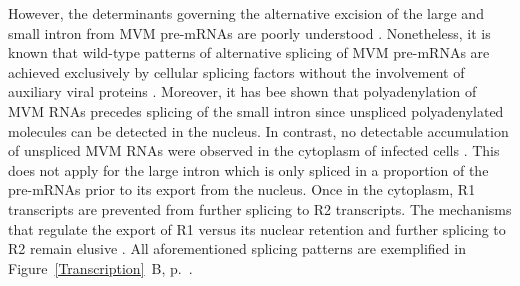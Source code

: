 However, the determinants governing the alternative excision of the large and small intron from MVM pre-mRNAs are poorly understood \cite{pmid9499034, pmid10329570, pmid8151756, pmid7666519, pmid7637034, pmid9858560}. Nonetheless, it is known that wild-type patterns of alternative splicing of MVM pre-mRNAs are achieved exclusively by cellular splicing factors without the involvement of auxiliary viral proteins \cite{pmid1592259}. Moreover, it has bee shown that polyadenylation of MVM RNAs precedes splicing of the small intron since unspliced polyadenylated molecules can be detected in the nucleus. In contrast, no detectable accumulation of unspliced MVM RNAs were observed in the cytoplasm of infected cells \cite{pmid3346950}. This does not apply for the large intron which is only spliced in a proportion of the pre-mRNAs prior to its export from the nucleus. Once in the cytoplasm, R1 transcripts are prevented from further splicing to R2 transcripts. The mechanisms that regulate the export of R1 versus its nuclear retention and further splicing to R2 remain elusive \cite{Transcription}. All aforementioned splicing patterns are exemplified in Figure~\ref{Transcription}~B, p.~\pageref{Transcription}. 

